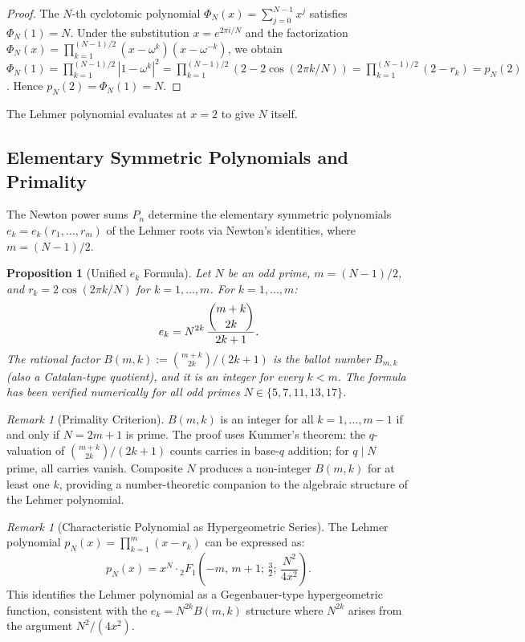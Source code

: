 \documentclass[aip,jmp,reprint,superscriptaddress,floatfix,nofootinbib]{revtex4-2}
\newtheorem{proposition}[theorem]{Proposition}
\theoremstyle{definition}
\theoremstyle{remark}
\newtheorem{remark}[theorem]{Remark}
\begin{document}
\begin{proof}
The $N$-th cyclotomic polynomial $\Phi_N(x) = \sum_{j=0}^{N-1} x^j$
satisfies $\Phi_N(1) = N$.  Under the substitution $x = e^{2\pi i/N}$
and the factorization
$\Phi_N(x) = \prod_{k=1}^{(N-1)/2}(x - \omega^k)(x - \omega^{-k})$,
we obtain
$\Phi_N(1) = \prod_{k=1}^{(N-1)/2}|1 - \omega^k|^2
= \prod_{k=1}^{(N-1)/2}(2 - 2\cos(2\pi k/N))
= \prod_{k=1}^{(N-1)/2}(2 - r_k) = p_N(2)$.
Hence $p_N(2) = \Phi_N(1) = N$.
\end{proof}

The Lehmer polynomial evaluates at $x = 2$ to give $N$ itself.

\subsection{Elementary Symmetric Polynomials and Primality}
\label{sec:newton:esym}

The Newton power sums $P_n$ determine the elementary symmetric
polynomials $e_k = e_k(r_1,\ldots,r_m)$ of the Lehmer roots via
Newton's identities, where $m = (N{-}1)/2$.

\begin{proposition}[Unified $e_k$ Formula]\label{prop:esym}
Let $N$ be an odd prime, $m = (N{-}1)/2$, and $r_k = 2\cos(2\pi k/N)$
for $k = 1,\ldots,m$.  For $k = 1,\ldots,m$:
\begin{equation}\label{eq:esym-formula}
  e_k = N^{2k}\,\frac{\dbinom{m+k}{2k}}{2k+1}.
\end{equation}
The rational factor $B(m,k) := \binom{m+k}{2k}/(2k+1)$ is the ballot
number $B_{m,k}$ (also a Catalan-type quotient), and it is an integer
for every $k < m$.  The formula has been verified numerically for all
odd primes $N \in \{5,7,11,13,17\}$.
\end{proposition}

\begin{remark}[Primality Criterion]\label{rem:primality}
$B(m,k)$ is an integer for all $k = 1,\ldots,m{-}1$ if and only if
$N = 2m+1$ is prime.  The proof uses Kummer's theorem: the
$q$-valuation of $\binom{m+k}{2k}/(2k+1)$ counts carries in
base-$q$ addition; for $q \mid N$ prime, all carries vanish.
Composite $N$ produces a non-integer $B(m,k)$ for at least one $k$,
providing a number-theoretic companion to the algebraic structure
of the Lehmer polynomial.
\end{remark}

\begin{remark}[Characteristic Polynomial as Hypergeometric
  Series]\label{rem:hypergeo}
The Lehmer polynomial $p_N(x) = \prod_{k=1}^{m}(x - r_k)$
can be expressed as:
\begin{equation}\label{eq:char-hypergeo}
  p_N(x) = x^N \cdot {}_2F_1\!\left(-m,\,m{+}1;\,\tfrac{3}{2};\,
    \frac{N^2}{4x^2}\right).
\end{equation}
This identifies the Lehmer polynomial as a Gegenbauer-type
hypergeometric function, consistent with the $e_k = N^{2k} B(m,k)$
structure where $N^{2k}$ arises from the argument $N^2/(4x^2)$.
\end{remark}
\end{document}
